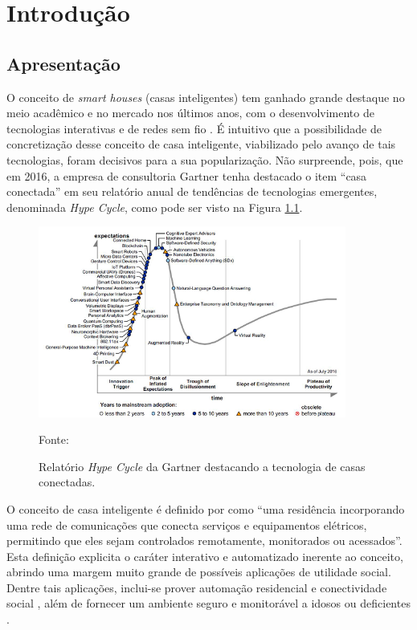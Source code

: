 \chapter{Introdução}\label{chp:intro}

\section{Apresentação}\label{sec:presentation}
O conceito de \textit{smart houses} (casas inteligentes) tem ganhado grande destaque no meio acadêmico e no mercado nos últimos anos, com o desenvolvimento de tecnologias interativas e de redes sem fio \cite{harper2006}. É intuitivo que a possibilidade de concretização desse conceito de casa inteligente, viabilizado pelo avanço de tais tecnologias, foram decisivos  para a sua popularização. Não surpreende, pois, que em 2016, a empresa de consultoria Gartner tenha destacado o item ``casa conectada'' em seu relatório anual de tendências de tecnologias emergentes, denominada \textit{Hype Cycle}, como pode ser visto na Figura \ref{fig:gartner}.

\begin{figure}[h]
	\centering
	\caption{Relatório \textit{Hype Cycle} da Gartner destacando a tecnologia de casas conectadas.}
  \includegraphics[width=0.9\textwidth]{imagens/gartner.png}
  \label{fig:gartner}
  
  Fonte: \cite{gartner}
\end{figure}

O conceito de casa inteligente é definido por \cite{jiang2004} como ``uma residência incorporando uma rede de comunicações que conecta serviços e equipamentos elétricos, permitindo que eles sejam controlados remotamente, monitorados ou acessados''. Esta definição explicita o caráter interativo e automatizado inerente ao conceito, abrindo uma margem muito grande de possíveis aplicações de utilidade social. Dentre tais aplicações, inclui-se prover automação residencial e conectividade social \cite{harper2006}, além de fornecer um ambiente seguro e monitorável a idosos ou deficientes \cite{chan2008}.


